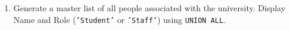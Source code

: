 \documentclass[12pt,a4paper]{article}
\begin{document}
\begin{enumerate}



\item Generate a master list of all people associated with the university. Display Name and Role (\texttt{'Student'} or \texttt{'Staff'}) using \texttt{UNION ALL}.





\end{enumerate}
\end{document}
